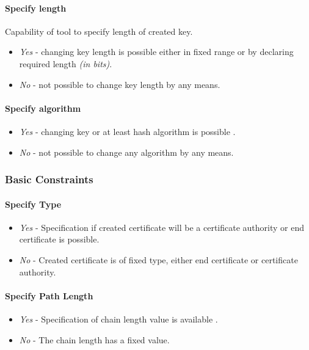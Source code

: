 \documentclass[10pt, a4paper]{report}
\begin{document}
\paragraph{Specify length}
Capability of tool to specify length of created key.
\begin{itemize}
 \item \textit{Yes} - changing key length is possible either in fixed range or by declaring required length \textit{(in bits)}.
 \item \textit{No} - not possible to change key length by any means.
\end{itemize}

\paragraph{Specify algorithm}

\begin{itemize}
 \item \textit{Yes} - changing key or at least hash algorithm is possible .
 \item \textit{No} - not possible to change any algorithm by any means.
\end{itemize}

\subsubsection{Basic Constraints}

\paragraph{Specify Type}

\begin{itemize}
 \item \textit{Yes} - Specification if created certificate will be a certificate authority or end certificate is possible.
 \item \textit{No} - Created certificate is of fixed type, either end certificate or certificate authority.
\end{itemize}

\paragraph{Specify Path Length}

\begin{itemize}
 \item \textit{Yes} - Specification of chain length value is available .
 \item \textit{No} - The chain length has a fixed value.
\end{itemize}
\end{document}
